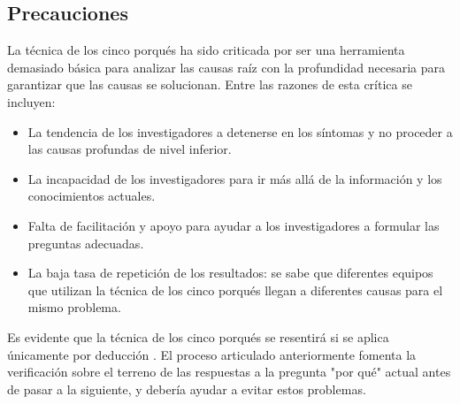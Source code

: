 \subsection{Precauciones}

La técnica de los cinco porqués ha sido criticada por ser una herramienta demasiado básica para analizar las causas raíz con la profundidad necesaria para garantizar que las causas se solucionan.
Entre las razones de esta crítica se incluyen:

\begin{itemize}
    \item La tendencia de los investigadores a detenerse en los síntomas y no proceder a las causas profundas de nivel inferior.
    \item La incapacidad de los investigadores para ir más allá de la información y los conocimientos actuales.
    \item Falta de facilitación y apoyo para ayudar a los investigadores a formular las preguntas adecuadas.
    \item La baja tasa de repetición de los resultados: se sabe que diferentes equipos que utilizan la técnica de los cinco porqués llegan a diferentes causas para el mismo problema.
\end{itemize}

Es evidente que la técnica de los cinco porqués se resentirá si se aplica únicamente por deducción \cite{serrat_five_2017}.
El proceso articulado anteriormente fomenta la verificación sobre el terreno de las respuestas a la pregunta "por qué" actual antes de pasar a la siguiente, y debería ayudar a evitar estos problemas.